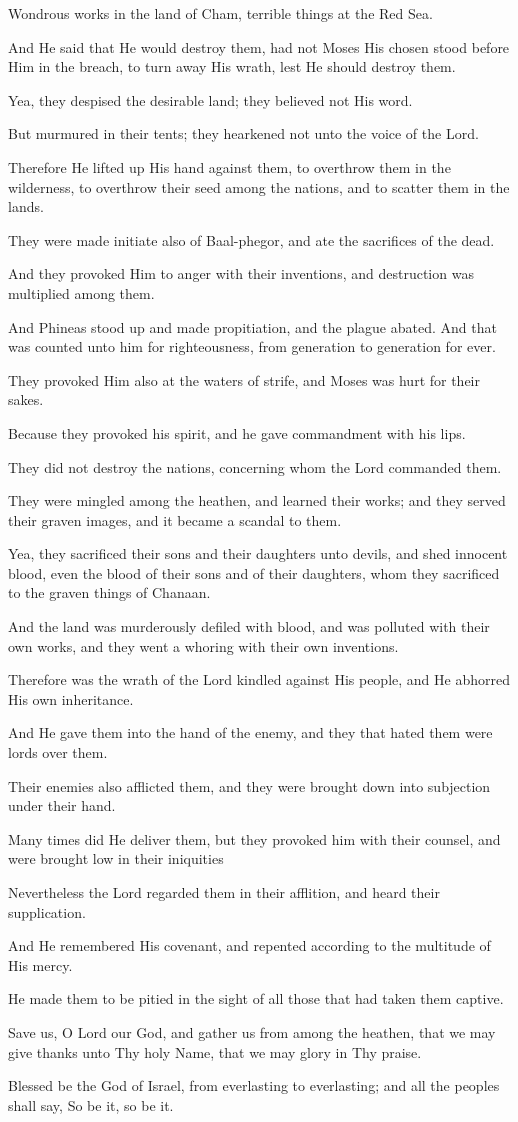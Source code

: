 Wondrous works in the land of Cham, terrible things at the Red Sea.

And He said that He would destroy them, had not Moses His chosen stood before Him in the breach, to turn away His wrath, lest He should destroy them.

Yea, they despised the desirable land; they believed not His
word.

But murmured in their tents; they hearkened not unto the voice of the Lord.

Therefore He lifted up His hand against them, to overthrow them in the wilderness, to overthrow their seed among the nations, and to scatter them in the lands.

They were made initiate also of Baal-phegor, and ate the sacrifices of the dead.

And they provoked Him to anger with their inventions, and destruction was multiplied among them.

And Phineas stood up and made propitiation, and the plague abated. And that was counted unto him for righteousness, from generation to generation for ever.

They provoked Him also at the waters of strife, and Moses was hurt for their sakes.

Because they provoked his spirit, and he gave commandment with his lips.

They did not destroy the nations, concerning whom the Lord commanded them.

They were mingled among the heathen, and learned their works; and they served their graven images, and it became a scandal to them.

Yea, they sacrificed their sons and their daughters unto devils, and shed innocent blood, even the blood of their sons and of their daughters, whom they sacrificed to the graven things of Chanaan.

And the land was murderously defiled with blood, and was polluted with their own works, and they went a whoring with their own inventions.

Therefore was the wrath of the Lord kindled against His people, and He abhorred His own inheritance.

And He gave them into the hand of the enemy, and they that hated them were lords over them.

Their enemies also afflicted them, and they were brought down into subjection under their hand.

Many times did He deliver them, but they provoked him with their counsel, and were brought low in their iniquities

Nevertheless the Lord regarded them in their afflition, and heard their supplication.

And He remembered His covenant, and repented according to the multitude of His mercy.

He made them to be pitied in the sight of all those that had taken them captive.

Save us, O Lord our God, and gather us from among the heathen, that we may give thanks unto Thy holy Name, that we may glory in Thy praise.

Blessed be the God of Israel, from everlasting to everlasting; and all the peoples shall say, So be it, so be it.
